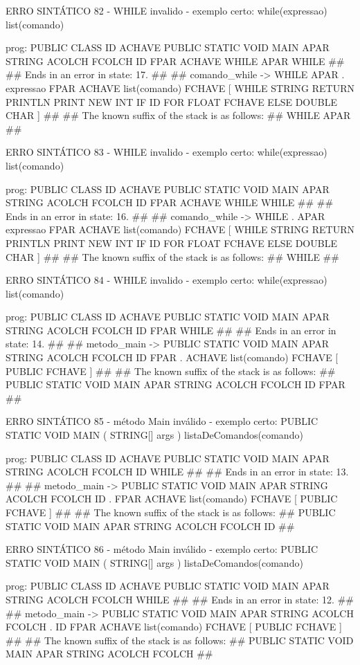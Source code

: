\documentclass[12pt,a4paper,twoside]{report}
\begin{document}
\begin{terminal}
{ERRO SINTÁTICO 82 -  WHILE invalido - exemplo certo: while(expressao){ list(comando)}

prog: PUBLIC CLASS ID ACHAVE PUBLIC STATIC VOID MAIN APAR STRING ACOLCH FCOLCH ID FPAR ACHAVE WHILE APAR WHILE 
##
## Ends in an error in state: 17.
##
## comando_while -> WHILE APAR . expressao FPAR ACHAVE list(comando) FCHAVE [ WHILE STRING RETURN PRINTLN PRINT NEW INT IF ID FOR FLOAT FCHAVE ELSE DOUBLE CHAR ]
##
## The known suffix of the stack is as follows:
## WHILE APAR 
##

ERRO SINTÁTICO 83 - WHILE invalido - exemplo certo: while(expressao){ list(comando)}

prog: PUBLIC CLASS ID ACHAVE PUBLIC STATIC VOID MAIN APAR STRING ACOLCH FCOLCH ID FPAR ACHAVE WHILE WHILE 
##
## Ends in an error in state: 16.
##
## comando_while -> WHILE . APAR expressao FPAR ACHAVE list(comando) FCHAVE [ WHILE STRING RETURN PRINTLN PRINT NEW INT IF ID FOR FLOAT FCHAVE ELSE DOUBLE CHAR ]
##
## The known suffix of the stack is as follows:
## WHILE 
##

ERRO SINTÁTICO 84 - WHILE invalido - exemplo certo: while(expressao){ list(comando)}

prog: PUBLIC CLASS ID ACHAVE PUBLIC STATIC VOID MAIN APAR STRING ACOLCH FCOLCH ID FPAR WHILE 
##
## Ends in an error in state: 14.
##
## metodo_main -> PUBLIC STATIC VOID MAIN APAR STRING ACOLCH FCOLCH ID FPAR . ACHAVE list(comando) FCHAVE [ PUBLIC FCHAVE ]
##
## The known suffix of the stack is as follows:
## PUBLIC STATIC VOID MAIN APAR STRING ACOLCH FCOLCH ID FPAR 
##

ERRO SINTÁTICO 85 - método Main inválido -  exemplo certo: PUBLIC STATIC VOID MAIN ( STRING[] args ){  listaDeComandos(comando) }

prog: PUBLIC CLASS ID ACHAVE PUBLIC STATIC VOID MAIN APAR STRING ACOLCH FCOLCH ID WHILE 
##
## Ends in an error in state: 13.
##
## metodo_main -> PUBLIC STATIC VOID MAIN APAR STRING ACOLCH FCOLCH ID . FPAR ACHAVE list(comando) FCHAVE [ PUBLIC FCHAVE ]
##
## The known suffix of the stack is as follows:
## PUBLIC STATIC VOID MAIN APAR STRING ACOLCH FCOLCH ID 
##

ERRO SINTÁTICO 86 - método Main inválido -  exemplo certo: PUBLIC STATIC VOID MAIN ( STRING[] args ){  listaDeComandos(comando) }

prog: PUBLIC CLASS ID ACHAVE PUBLIC STATIC VOID MAIN APAR STRING ACOLCH FCOLCH WHILE 
##
## Ends in an error in state: 12.
##
## metodo_main -> PUBLIC STATIC VOID MAIN APAR STRING ACOLCH FCOLCH . ID FPAR ACHAVE list(comando) FCHAVE [ PUBLIC FCHAVE ]
##
## The known suffix of the stack is as follows:
## PUBLIC STATIC VOID MAIN APAR STRING ACOLCH FCOLCH 
##

}
\end{terminal}
\end{document}
